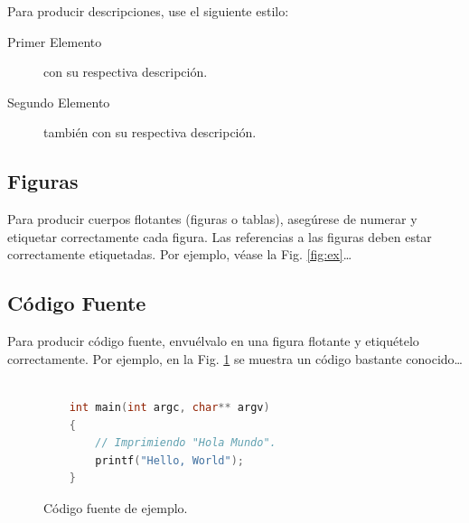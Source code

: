 \documentclass[a4paper,10pt,twocolumn]{article}
\begin{document}
		Para producir descripciones, use el siguiente estilo:

		\begin{description}
			\item [Primer Elemento] con su respectiva descripción.
			\item [Segundo Elemento] también con su respectiva descripción.
		\end{description}

	\subsection{Figuras}\label{sub:figures}
		Para producir cuerpos flotantes (figuras o tablas), asegúrese de numerar
		y etiquetar correctamente cada figura. Las referencias a las figuras deben
		estar correctamente etiquetadas. Por ejemplo, véase la Fig. \ref{fig:ex}\ldots
		
	\subsection{Código Fuente}\label{sub:listings}
		Para producir código fuente, envuélvalo en una figura flotante y
		etiquételo correctamente. Por ejemplo, en la Fig. \ref{fig:code}
		se muestra un código bastante conocido\ldots


		\begin{figure}[htb]%
			\begin{lstlisting}[language=c]%

    int main(int argc, char** argv)
    {
        // Imprimiendo "Hola Mundo".
        printf("Hello, World");
    }

			\end{lstlisting}
		\caption{Código fuente de ejemplo.\label{fig:code}}
		\end{figure}

\end{document}
